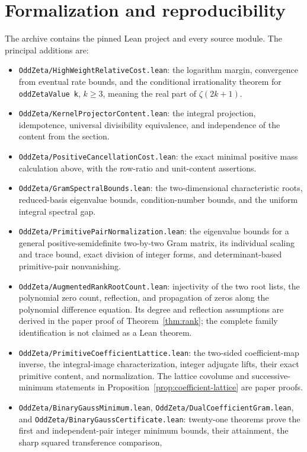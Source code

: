\documentclass[11pt]{article}
\theoremstyle{remark}
\begin{document}
\section{Formalization and reproducibility}
The archive contains the pinned Lean project and every source module.
The principal additions are:
\begin{itemize}
\item \texttt{OddZeta/HighWeightRelativeCost.lean}:
the logarithm margin, convergence from eventual rate bounds, and the
conditional irrationality theorem for \texttt{oddZetaValue k},
\(k\ge3\), meaning the real part of \(\zeta(2k+1)\).
\item \texttt{OddZeta/KernelProjectorContent.lean}:
the integral projection, idempotence, universal divisibility equivalence,
and independence of the content from the section.
\item \texttt{OddZeta/PositiveCancellationCost.lean}:
the exact minimal positive mass calculation above, with the row-ratio and
unit-content assertions.
\item \texttt{OddZeta/GramSpectralBounds.lean}:
the two-dimensional characteristic roots, reduced-basis eigenvalue
bounds, condition-number bounds, and the uniform integral spectral gap.
\item \texttt{OddZeta/PrimitivePairNormalization.lean}:
the eigenvalue bounds for a general positive-semidefinite two-by-two
Gram matrix, its individual scaling and trace bound, exact division of
integer forms, and determinant-based primitive-pair nonvanishing.
\item \texttt{OddZeta/AugmentedRankRootCount.lean}:
injectivity of the two root lists, the polynomial zero count, reflection,
and propagation of zeros along the polynomial difference equation.
Its degree and reflection assumptions are derived in the paper proof
of Theorem~\ref{thm:rank}; the complete family identification is not
claimed as a Lean theorem.
\item \texttt{OddZeta/PrimitiveCoefficientLattice.lean}:
the two-sided coefficient-map inverse, the integral-image characterization,
integer adjugate lifts, their exact primitive content, and normalization.
The lattice covolume and successive-minimum statements in
Proposition~\ref{prop:coefficient-lattice} are paper proofs.
\item \texttt{OddZeta/BinaryGaussMinimum.lean},
\texttt{OddZeta/DualCoefficientGram.lean}, and
\texttt{OddZeta/BinaryGaussCertificate.lean}:
twenty-one theorems prove the first and independent-pair integer minimum
bounds, their attainment, the sharp squared transference comparison,

\end{itemize}
\end{document}
